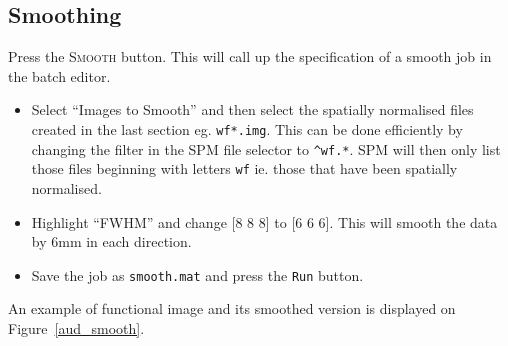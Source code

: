 \subsection{Smoothing}

Press the \textsc{Smooth} button. This will call up the specification of a smooth job in the batch editor.

\begin{itemize}
\item Select ``Images to Smooth'' and then select the spatially normalised files created in the last section eg. \texttt{wf*.img}. This can be done efficiently by changing the filter in the SPM file selector to \texttt{\textasciicircum wf.*}. SPM will then only list those files beginning with letters \texttt{wf} ie. those that have been spatially normalised.
\item Highlight ``FWHM'' and change [8 8 8] to [6 6 6]. This will smooth the data by 6mm in each direction.
\item Save the job as \texttt{smooth.mat} and press the \texttt{Run} button.
\end{itemize}

An example of functional image and its smoothed version is displayed on Figure~\ref{aud_smooth}.

